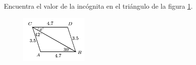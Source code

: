 \question[10]  Encuentra el valor de la incógnita en el triángulo de la figura \ref{fig:angle_triangle_09}.
\begin{figure}[H]
    \begin{center}
        \includegraphics[width=0.3\textwidth]{../images/angle_triangle_09.png}
    \end{center}
    \caption{}
    \label{fig:angle_triangle_09}
\end{figure}